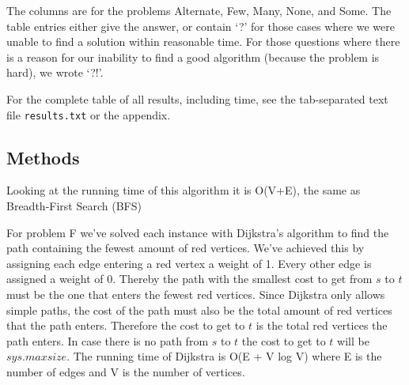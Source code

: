 \documentclass[a4paper]{article}
\begin{document}
The columns are for the problems Alternate, Few, Many, None, and Some.
The table entries either give the answer, or contain `?' for those cases where we were unable to find a solution within reasonable time.
For those questions where there is a reason for our inability to find a good algorithm (because the problem is hard), we wrote `?!'.

For the complete table of all results, including time, see the tab-separated text file {\tt results.txt} or the appendix.

\subsection{Methods}

Looking at the running time of this algorithm it is O(V+E), the same as Breadth-First Search (BFS)

For problem F we've solved each instance with Dijkstra's algorithm to find the path containing the fewest amount of red vertices. We've achieved this by assigning each edge entering a red vertex a weight of 1. Every other edge is assigned a weight of 0. Thereby the path with the smallest cost to get from $s$ to $t$ must be the one that enters the fewest red vertices. Since Dijkstra only allows simple paths, the cost of the path must also be the total amount of red vertices that the path enters. Therefore the cost to get to $t$ is the total red vertices the path enters. In case there is no path from $s$ to $t$ the cost to get to $t$ will be $sys.maxsize$. The running time of Dijkstra is O(E + V log V) where E is the number of edges and V is the number of vertices.
\end{document}
